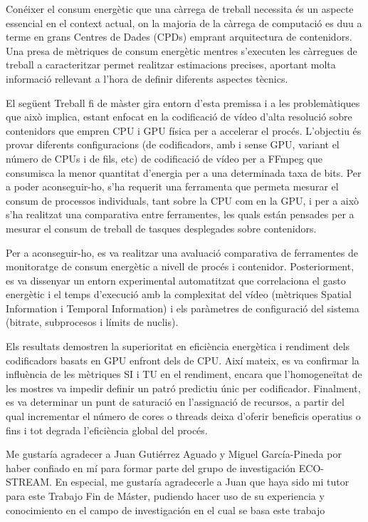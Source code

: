 \documentclass[twoside,english,a4paper,12pt]{plantilla/twcam-tfm-doc}
\begin{document}
\begin{resum}
 Conéixer el consum energètic que una càrrega de treball necessita és un aspecte essencial en el context actual, on la majoria de la càrrega de computació es duu a terme en grans Centres de Dades (CPDs) emprant arquitectura de contenidors. Una presa de mètriques de consum energètic mentres s'executen les càrregues de treball a caracteritzar permet realitzar estimacions precises, aportant molta informació rellevant a l'hora de definir diferents aspectes tècnics. 
 
 El següent Treball fi de màster gira entorn d'esta premissa i a les problemàtiques que això implica, estant enfocat en la codificació de vídeo d'alta resolució sobre contenidors que empren CPU i GPU física per a accelerar el procés. L'objectiu és provar diferents configuracions (de codificadors, amb i sense GPU, variant el número de CPUs i de fils, etc) de codificació de vídeo per a FFmpeg que consumisca la menor quantitat d'energia per a una determinada taxa de bits. Per a poder aconseguir-ho, s'ha requerit una ferramenta que permeta mesurar el consum de processos individuals, tant sobre la CPU com en la GPU, i per a això s'ha realitzat una comparativa entre ferramentes, les quals están pensades per a mesurar el consum de treball de tasques desplegades sobre contenidors.
 
 Per a aconseguir-ho, es va realitzar una avaluació comparativa de ferramentes de monitoratge de consum energètic a nivell de procés i contenidor. Posteriorment, es va dissenyar un entorn experimental automatitzat que correlaciona el gasto energètic i el temps d'execució amb la complexitat del vídeo (mètriques Spatial Information i Temporal Information) i els paràmetres de configuració del sistema (bitrate, subprocesos i límits de nuclis).
 
 Els resultats demostren la superioritat en eficiència energètica i rendiment dels codificadors basats en GPU enfront dels de CPU. Així mateix, es va confirmar la influència de les mètriques SI i TU en el rendiment, encara que l'homogeneïtat de les mostres va impedir definir un patró predictiu únic per codificador. Finalment, es va determinar un punt de saturació en l'assignació de recursos, a partir del qual incrementar el número de cores o threads deixa d'oferir beneficis operatius o fins i tot degrada l'eficiència global del procés.
\end{resum}

\clearpage
\begin{agradecimientos}
 Me gustaría agradecer a Juan Gutiérrez Aguado y Miguel García-Pineda por haber confiado en mí para formar parte del grupo de investigación ECO-STREAM. En especial, me gustaría agradecerle a Juan que haya sido mi tutor para este Trabajo Fin de Máster, pudiendo hacer uso de su experiencia y conocimiento en el campo de investigación en el cual se basa este trabajo
\end{agradecimientos}
\clearpage
\tableofcontents
\end{document}
